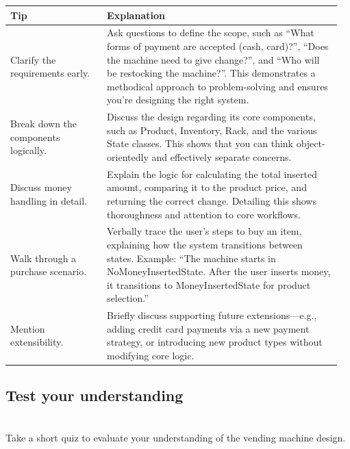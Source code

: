 \begin{center}
\begin{tabular}{|p{0.28\linewidth}|p{0.68\linewidth}|}
\hline
\textbf{Tip} & \textbf{Explanation} \\
\hline

Clarify the requirements early. &
Ask questions to define the scope, such as “What forms of payment are accepted (cash, card)?”, “Does the machine need to give change?”, and “Who will be restocking the machine?”. This demonstrates a methodical approach to problem-solving and ensures you’re designing the right system. \\
\hline

Break down the components logically. &
Discuss the design regarding its core components, such as Product, Inventory, Rack, and the various State classes. This shows that you can think object-orientedly and effectively separate concerns. \\
\hline

Discuss money handling in detail. &
Explain the logic for calculating the total inserted amount, comparing it to the product price, and returning the correct change. Detailing this shows thoroughness and attention to core workflows. \\
\hline

Walk through a purchase scenario. &
Verbally trace the user’s steps to buy an item, explaining how the system transitions between states. Example: “The machine starts in NoMoneyInsertedState. After the user inserts money, it transitions to MoneyInsertedState for product selection.” \\
\hline

Mention extensibility. &
Briefly discuss supporting future extensions—e.g., adding credit card payments via a new payment strategy, or introducing new product types without modifying core logic. \\
\hline

\end{tabular}
\end{center}


\subsection{Test your understanding}\label{y_xQCUeYEmCBwR-Jxv--g}
\\
Take a short quiz to evaluate your understanding of the vending machine design.

